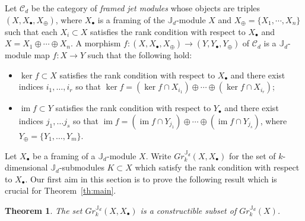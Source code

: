 \documentclass{amsart}
\numberwithin{equation}{section}
\newtheorem{theorem}{Theorem}[section]
\theoremstyle{definition}
\def\JJ{\mathbb{J}}
\def\cC{\mathcal{C}}
\def\im{\operatorname{im}}
\begin{document}
{Let $\cC_d$ be the category of \emph{framed jet modules} whose objects are triples $(X,X_\bullet,X_\oplus)$, where $X_\bullet$ is a framing of the $\JJ_d$-module $X$ and $X_\oplus=\{X_1,\cdots,X_n\}$ such that each $X_i\subset X$ satisfies the rank condition with respect to $X_\bullet$ and $X=X_1\oplus\cdots\oplus X_n$.  A morphism $f:(X,X_\bullet,X_\oplus)\to(Y,Y_\bullet,Y_\oplus)$ of $\cC_d$ is a $\JJ_d$-module map $f:X\to Y$ such that the following hold:
\begin{itemize}
  \item $\ker f\subset X$ satisfies the rank condition with respect to $X_\bullet$ and there exist indices $i_1,\ldots,i_r$ so that $\ker f=(\ker f\cap X_{i_1})\oplus\cdots\oplus(\ker f\cap X_{i_r})$;
  \item $\im f\subset Y$ satisfies the rank condition with respect to $Y_\bullet$ and there exist indices $j_1,\ldots j_s$ so that $\im f=(\im f\cap Y_{j_1})\oplus\cdots\oplus(\im f\cap Y_{j_s})$, where $Y_\oplus=\{Y_1,\ldots,Y_m\}$.
\end{itemize}}%

Let $X_\bullet$ be a framing of a $\JJ_d$-module $X$.  Write $Gr_k^{\JJ_d}(X,X_\bullet)$ for the set of $k$-dimensional $\JJ_d$-submodules $K\subset X$ which satisfy the rank condition with respect to $X_\bullet$.  Our first aim in this section is to prove the following result which is crucial for Theorem~\ref{th:main}.
\begin{theorem}\label{th:flag grassmannian}
  The set $Gr^{\JJ_d}_k(X,X_\bullet)$ is a constructible subset of $Gr^{\JJ_d}_k(X)$.
\end{theorem}
\end{document}

